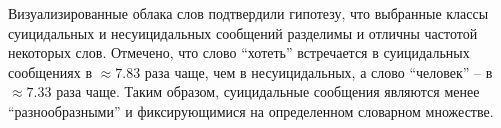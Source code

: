 Визуализированные облака слов подтвердили гипотезу, что выбранные классы суицидальных и несуицидальных сообщений разделимы и отличны частотой некоторых слов. 
Отмечено, что слово ``хотеть'' встречается в суицидальных сообщениях в $\approx 7.83$ раза чаще, чем в несуицидальных, а слово ``человек'' -- в $\approx 7.33$ раза чаще. 
Таким образом, суицидальные сообщения являются менее ``разнообразными'' и фиксирующимися на определенном словарном множестве.

